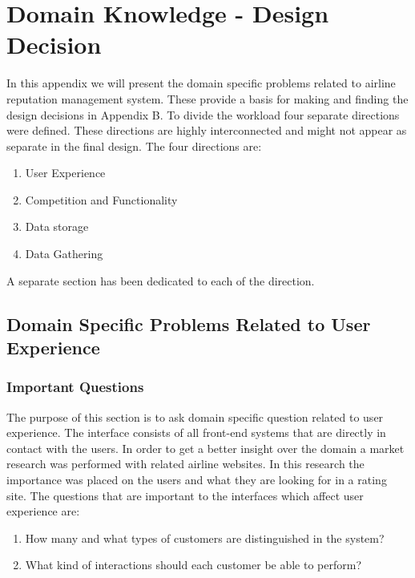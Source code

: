 \section{Domain Knowledge - Design Decision}
In this appendix we will present the domain specific problems related to airline reputation management system. These provide a basis for making and finding the design decisions in Appendix B. 
To divide the workload four separate directions were defined. These directions are highly interconnected and might not appear as separate in the final design. The four directions are:
\begin{enumerate}
\item User Experience
\item Competition and Functionality
\item Data storage
\item Data Gathering
\end{enumerate}
A separate section has been dedicated to each of the direction. 

\subsection{Domain Specific Problems Related to User Experience}
\subsubsection{Important Questions}
The purpose of this section is to ask domain specific question related to user experience. The interface consists of all front-end systems that are directly in contact with the users. 
In order to get a better insight over the domain a market research was performed with related airline websites. In this research the importance was placed on the users and what they are looking for in a rating site. 
The questions that are important to the interfaces which affect user experience are:
\begin{enumerate}
\item How many and what types of customers are distinguished in the system?
\item What kind of interactions should each customer be able to perform?
\end{enumerate}

